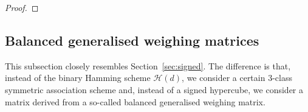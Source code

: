 \documentclass[11pt]{article}
\begin{document}
\begin{proof}

\end{proof}





\subsection{Balanced generalised weighing matrices}\label{sec:bgw}

This subsection closely resembles Section~\ref{sec:signed}.
The difference is that, instead of the binary Hamming scheme $\mathcal H(d)$, we consider a certain 3-class symmetric association scheme and, instead of a signed hypercube, we consider a matrix derived from a so-called balanced generalised weighing matrix.
\end{document}
